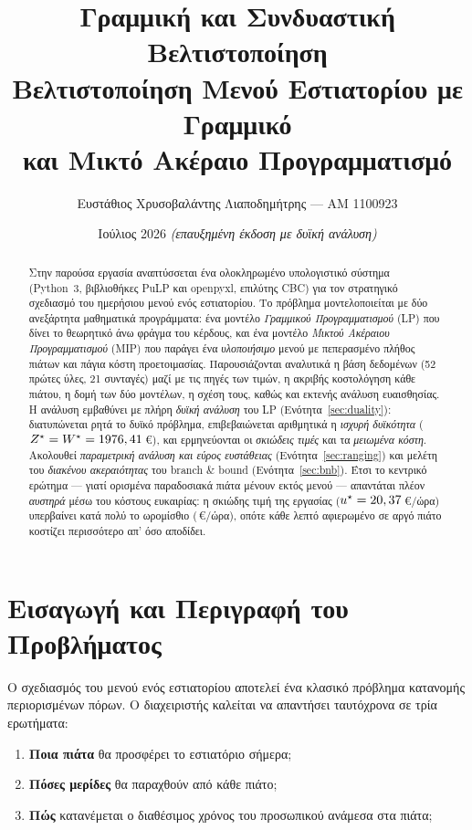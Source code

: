 \documentclass[11pt,a4paper]{article}
\title{\color{navy}\bfseries\huge Γραμμική και Συνδυαστική Βελτιστοποίηση\\[0.3em]
\normalsize\mdseries\color{black} Βελτιστοποίηση Μενού Εστιατορίου με Γραμμικό\\
και Μικτό Ακέραιο Προγραμματισμό}
\author{Ευστάθιος Χρυσοβαλάντης Λιαποδημήτρης — ΑΜ 1100923}
\date{Ιούλιος 2026 \;\textit{(επαυξημένη έκδοση με δυϊκή ανάλυση)}}
\newcommand{\en}[1]{\textenglish{#1}}
\begin{document}
\maketitle
\thispagestyle{empty}

\begin{abstract}
\noindent
Στην παρούσα εργασία αναπτύσσεται ένα ολοκληρωμένο υπολογιστικό σύστημα
(Python~3, βιβλιοθήκες \en{PuLP} και \en{openpyxl}, επιλύτης \en{CBC}) για τον
στρατηγικό σχεδιασμό του ημερήσιου μενού ενός εστιατορίου. Το πρόβλημα
μοντελοποιείται με δύο ανεξάρτητα μαθηματικά προγράμματα: ένα μοντέλο
\emph{Γραμμικού Προγραμματισμού} (\en{LP}) που δίνει το θεωρητικό άνω φράγμα του
κέρδους, και ένα μοντέλο \emph{Μικτού Ακέραιου Προγραμματισμού} (\en{MIP}) που
παράγει ένα \emph{υλοποιήσιμο} μενού με πεπερασμένο πλήθος πιάτων και πάγια κόστη
προετοιμασίας. Παρουσιάζονται αναλυτικά η βάση δεδομένων (52 πρώτες ύλες, 21
συνταγές) μαζί με τις πηγές των τιμών, η ακριβής κοστολόγηση κάθε πιάτου, η δομή
των δύο μοντέλων, η σχέση τους, καθώς και εκτενής ανάλυση ευαισθησίας. Η ανάλυση
εμβαθύνει με πλήρη \emph{δυϊκή ανάλυση} του \en{LP} (Ενότητα~\ref{sec:duality}):
διατυπώνεται ρητά το δυϊκό πρόβλημα, επιβεβαιώνεται αριθμητικά η \emph{ισχυρή
δυϊκότητα} ($Z^\star=W^\star=1976,41$\,€), και ερμηνεύονται οι \emph{σκιώδεις τιμές}
και τα \emph{μειωμένα κόστη}. Ακολουθεί \emph{παραμετρική ανάλυση και εύρος
ευστάθειας} (Ενότητα~\ref{sec:ranging}) και μελέτη του \emph{διακένου ακεραιότητας}
του \en{branch \& bound} (Ενότητα~\ref{sec:bnb}). Έτσι το κεντρικό ερώτημα — γιατί ορισμένα
παραδοσιακά πιάτα μένουν εκτός μενού — απαντάται πλέον \emph{αυστηρά} μέσω του
κόστους ευκαιρίας: η σκιώδης τιμή της εργασίας ($u^\star=20,37$\,€/ώρα)
υπερβαίνει κατά πολύ το ωρομίσθιο (\LaborWage\,€/ώρα), οπότε κάθε λεπτό
αφιερωμένο σε αργό πιάτο κοστίζει περισσότερο απ' όσο αποδίδει.
\end{abstract}

\tableofcontents
\newpage

\section{Εισαγωγή και Περιγραφή του Προβλήματος}
Ο σχεδιασμός του μενού ενός εστιατορίου αποτελεί ένα κλασικό πρόβλημα κατανομής
περιορισμένων πόρων. Ο διαχειριστής καλείται να απαντήσει ταυτόχρονα σε τρία
ερωτήματα:
\begin{enumerate}
  \item \textbf{Ποια πιάτα} θα προσφέρει το εστιατόριο σήμερα;
  \item \textbf{Πόσες μερίδες} θα παραχθούν από κάθε πιάτο;
  \item \textbf{Πώς} κατανέμεται ο διαθέσιμος χρόνος του προσωπικού ανάμεσα στα πιάτα;
\end{enumerate}
\end{document}
